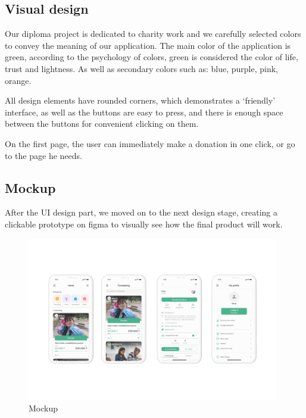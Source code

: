 \subsection{Visual design}

Our diploma project is dedicated to charity work and we carefully selected colors to
convey the meaning of our application. The main color of the application is green, according to the psychology of colors, green is considered the color of life, trust and lightness. As well as secondary colors such as: blue, purple, pink, orange. 

All design elements have rounded corners, which demonstrates a ‘friendly’ interface, as well as the buttons are easy to press, and there is enough space between the buttons for convenient clicking on them.

On the first page, the user can immediately make a donation in one click, or go to the page he needs.

\subsection{Mockup}

After the UI design part, we moved on to the next design stage, creating a clickable prototype on figma to visually see how the final product will work.

\begin{figure}[h]
    \centering
    \includegraphics[width=11cm]{figures/userInterface/mockups.jpg}
    \caption{Mockup}
    \label{fig:mockup}
\end{figure}